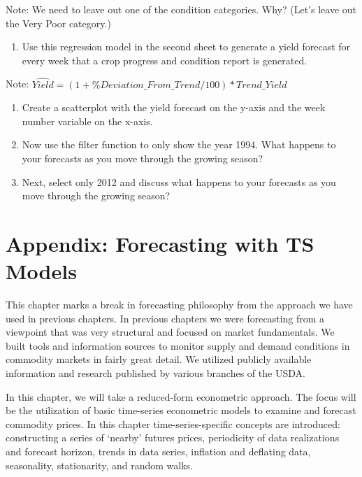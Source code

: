 \documentclass[
]{book}
\providecommand{\tightlist}{%
  \setlength{\itemsep}{0pt}\setlength{\parskip}{0pt}}
\begin{document}
Note: We need to leave out one of the condition categories. Why? (Let's leave out the Very Poor category.)

\begin{enumerate}
\def\labelenumi{\arabic{enumi}.}
\setcounter{enumi}{7}
\tightlist
\item
  Use this regression model in the second sheet to generate a yield forecast for every week that a crop progress and condition report is generated.
\end{enumerate}

Note: \(\hat{Yield}=(1+\%Deviation\_From\_Trend/100)*Trend\_Yield\)

\begin{enumerate}
\def\labelenumi{\arabic{enumi}.}
\setcounter{enumi}{8}
\item
  Create a scatterplot with the yield forecast on the y-axis and the week number variable on the x-axis.
\item
  Now use the filter function to only show the year 1994. What happens to your forecasts as you move through the growing season?
\item
  Next, select only 2012 and discuss what happens to your forecasts as you move through the growing season?
\end{enumerate}

\hypertarget{appendix-forecasting-with-ts-models}{%
\chapter{Appendix: Forecasting with TS Models}\label{appendix-forecasting-with-ts-models}}

This chapter marks a break in forecasting philosophy from the approach we have used in previous chapters. In previous chapters we were forecasting from a viewpoint that was very structural and focused on market fundamentals. We built tools and information sources to monitor supply and demand conditions in commodity markets in fairly great detail. We utilized publicly available information and research published by various branches of the USDA.

In this chapter, we will take a reduced-form econometric approach. The focus will be the utilization of basic time-series econometric models to examine and forecast commodity prices. In this chapter time-series-specific concepts are introduced: constructing a series of `nearby' futures prices, periodicity of data realizations and forecast horizon, trends in data series, inflation and deflating data, seasonality, stationarity, and random walks.
\end{document}

